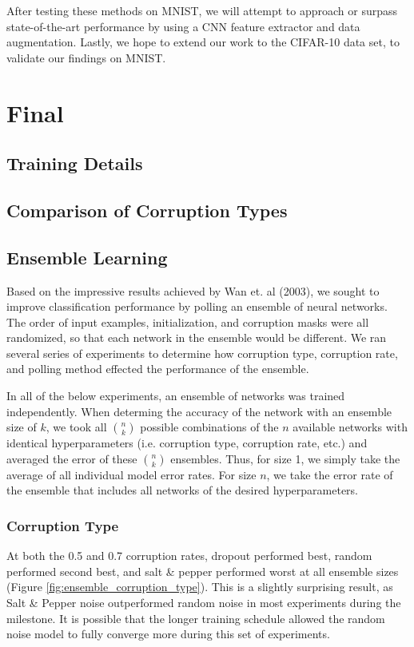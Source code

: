 \documentclass{article} %
\begin{document}
After testing these methods on MNIST, we will attempt to approach or surpass state-of-the-art performance by using a CNN feature extractor and data augmentation. Lastly, we hope to extend our work to the CIFAR-10 data set, to validate our findings on MNIST.

\section{Final}

\subsection{Training Details}


\subsection{Comparison of Corruption Types}

\subsection{Ensemble Learning}
Based on the impressive results achieved by Wan et. al (2003), we sought to improve classification performance by polling an ensemble of neural networks. The order of input examples, initialization, and corruption masks were all randomized, so that each network in the ensemble would be different. We ran several series of experiments to determine how corruption type, corruption rate, and polling method effected the performance of the ensemble.

In all of the below experiments, an ensemble of networks was trained independently. When determing the accuracy of the network with an ensemble size of $k$, we took all $n \choose k$ possible combinations of the $n$ available networks with identical hyperparameters (i.e. corruption type, corruption rate, etc.) and averaged the error of these $n \choose k$ ensembles. Thus, for size 1, we simply take the average of all individual model error rates. For size $n$, we take the error rate of the ensemble that includes all networks of the desired hyperparameters.

\subsubsection{Corruption Type}

At both the 0.5 and 0.7 corruption rates, dropout performed best, random performed second best, and salt \& pepper performed worst at all ensemble sizes (Figure \ref{fig:ensemble_corruption_type}). This is a slightly surprising result, as Salt \& Pepper noise outperformed random noise in most experiments during the milestone. It is possible that the longer training schedule allowed the random noise model to fully converge more during this set of experiments.
\end{document}
